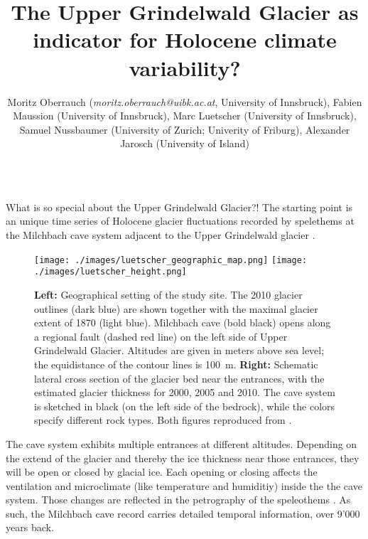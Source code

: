 \documentclass[final]{beamer}
\title{The Upper Grindelwald Glacier as indicator for Holocene climate variability?}
\subtitle{}
\author{Moritz Oberrauch (\textit{moritz.oberrauch@uibk.ac.at}, University of Innsbruck), Fabien Maussion (University of Innsbruck), Marc Luetscher (University of Innsbruck), Samuel Nussbaumer (University of Zurich; Univerity of Friburg), Alexander Jarosch (University of Island)}
\begin{document}
\begin{frame}[fragile]
\begin{columns}[t]

\begin{leftcolumn}
   \begin{boxblock}{What is so special about the Upper Grindelwald Glacier?!}
      The starting point is an unique time series of Holocene glacier fluctuations recorded by spelethems at the Milchbach cave system adjacent to the Upper Grindelwald glacier \citep[Bernese Oberland, Switzerland;][cf. Fig.~\ref{fig:map}]{Luetscher2011}.
      \begin{figure}[hb]
        \begin{center}
          \texttt{[image: ./images/luetscher\_geographic\_map.png]}
          \texttt{[image: ./images/luetscher\_height.png]}
        \end{center}
        \vspace{-6mm}
        \caption{\footnotesize \textbf{Left:} Geographical setting of the study site. The 2010 glacier outlines (dark blue) are shown together with the maximal glacier extent of 1870 (light blue). Milchbach cave (bold black) opens along a regional fault (dashed red line) on the left side of Upper Grindelwald Glacier. Altitudes are given in meters above sea level; the equidistance of the contour lines is 100~m. \textbf{Right:} Schematic lateral cross section of the glacier bed near the entrances, with the estimated glacier thickness for 2000, 2005 and 2010. The cave system is sketched in black (on the left side of the bedrock), while the colors specify different rock types. Both figures reproduced from \citet{Luetscher2011}.}
        \label{fig:map}
      \end{figure}
      The cave system exhibits multiple entrances at different altitudes. Depending on the extend of the glacier and thereby the ice thickness near those entrances, they will be open or closed by glacial ice. Each opening or closing affects the ventilation and microclimate (like temperature and humiditiy) inside the the cave system. Those changes are reflected in the petrography of the speleothems \citep{Luetscher2011}. As such, the Milchbach cave record carries detailed temporal information, over 9'000 years back.


\end{boxblock}
\end{leftcolumn}
\end{columns}
\end{frame}
\end{document}
